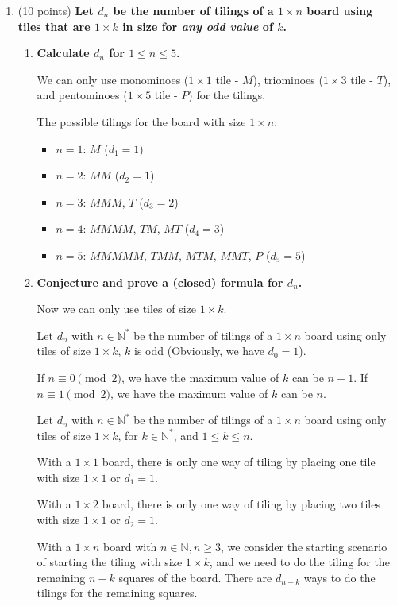 \documentclass[10pt]{article}
\begin{document}
\begin{enumerate}


\item (10 points)
\textbf{Let $d_n$ be the number of tilings of a $1\times n$ board using tiles that are $1\times k$ in size for {\it any odd value} of $k$.}
\begin{enumerate}
\item
\textbf{Calculate $d_n$ for $1\leq n\leq 5$.}

We can only use monominoes ($1 \times 1$ tile - $M$), triominoes ($1 \times 3$ tile - $T$), and pentominoes ($1 \times 5$ tile - $P$) for the tilings.

The possible tilings for the board with size $1 \times n$:

\begin{itemize}
    \item $n = 1$: $M$ ($d_1 = 1$)
    \item $n = 2$: $MM$ ($d_2 = 1$)
    \item $n = 3$: $MMM$, $T$  ($d_3 = 2$)
    \item $n = 4$: $MMMM$, $TM$, $MT$  ($d_4 = 3$)
    \item $n = 5$: $MMMMM$, $TMM$, $MTM$, $MMT$, $P$  ($d_5 = 5$)
\end{itemize}

\item
\textbf{Conjecture and prove a (closed) formula for $d_n$.}

Now we can only use tiles of size $1 \times k$.

Let $d_n$ with $n \in \mathbb{N}^*$ be the number of tilings of a $1 \times n$ board using only tiles of size $1 \times k$, $k$ is odd (Obviously, we have $d_0 = 1$). 

If $n \equiv 0 \pmod 2$, we have the maximum value of $k$ can be $n-1$. If $n \equiv 1 \pmod 2$, we have the maximum value of $k$ can be $n$. 

Let $d_n$ with $n \in \mathbb{N}^*$ be the number of tilings of a $1 \times n$ board using only tiles of size $1 \times k $, for $ k \in \mathbb{N}^*$, and $1 \leq k \leq n$.

With a $1 \times 1$ board, there is only one way of tiling by placing one tile with size $1 \times 1$ or $d_1 = 1$.

With a $1 \times 2$ board, there is only one way of tiling by placing two tiles with size $1 \times 1$ or $d_2 = 1$.

With a $1 \times n$ board with $n \in \mathbb{N}, n \geq 3$, we consider the starting scenario of starting the tiling with size $1 \times k$, and  we need to do the tiling for the remaining $n-k$ squares of the board. There are $d_{n-k}$ ways to do the tilings for the remaining squares.
 

\end{enumerate}
\end{enumerate}
\end{document}
